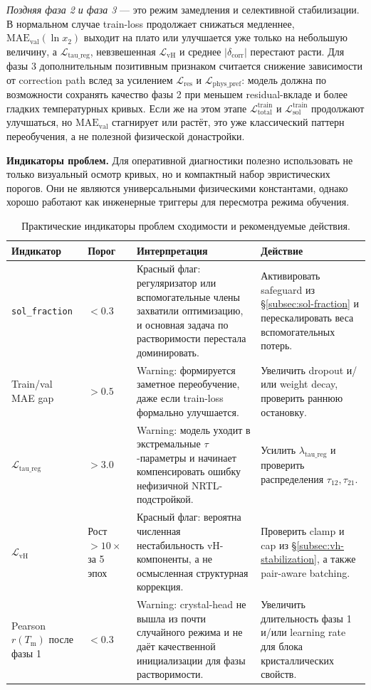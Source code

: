 \documentclass[11pt]{article}
\begin{document}
\textit{Поздняя фаза 2 и фаза 3} --- это режим замедления и селективной стабилизации. В нормальном случае train-loss продолжает снижаться медленнее, $\mathrm{MAE}_{\mathrm{val}}(\ln x_2)$ выходит на плато или улучшается уже только на небольшую величину, а $\mathcal{L}_{\mathrm{tau\_reg}}$, невзвешенная $\mathcal{L}_{\mathrm{vH}}$ и среднее $|\delta_{\mathrm{corr}}|$ перестают расти. Для фазы 3 дополнительным позитивным признаком считается снижение зависимости от correction path вслед за усилением $\mathcal{L}_{\mathrm{res}}$ и $\mathcal{L}_{\mathrm{phys\_pref}}$: модель должна по возможности сохранять качество фазы 2 при меньшем residual-вкладе и более гладких температурных кривых. Если же на этом этапе $\mathcal{L}_{\mathrm{total}}^{\mathrm{train}}$ и $\mathcal{L}_{\mathrm{sol}}^{\mathrm{train}}$ продолжают улучшаться, но $\mathrm{MAE}_{\mathrm{val}}$ стагнирует или растёт, это уже классический паттерн переобучения, а не полезной физической донастройки.

\textbf{Индикаторы проблем.} Для оперативной диагностики полезно использовать не только визуальный осмотр кривых, но и компактный набор эвристических порогов. Они не являются универсальными физическими константами, однако хорошо работают как инженерные триггеры для пересмотра режима обучения.

\begin{table}[H]
\centering
\small
\setlength{\tabcolsep}{4pt}
\begin{tabularx}{\textwidth}{|P{3.2cm}|P{2.0cm}|Y|Y|}
\hline
Индикатор & Порог & Интерпретация & Действие \\
\hline
\texttt{sol\_fraction} & $< 0.3$ & Красный флаг: регуляризатор или вспомогательные члены захватили оптимизацию, и основная задача по растворимости перестала доминировать. & Активировать safeguard из §\ref{subsec:sol-fraction} и перескалировать веса вспомогательных потерь. \\
\hline
Train/val MAE gap & $> 0.5$ & Warning: формируется заметное переобучение, даже если train-loss формально улучшается. & Увеличить dropout и/или weight decay, проверить раннюю остановку. \\
\hline
$\mathcal{L}_{\mathrm{tau\_reg}}$ & $> 3.0$ & Warning: модель уходит в экстремальные $\tau$-параметры и начинает компенсировать ошибку нефизичной NRTL-подстройкой. & Усилить $\lambda_{\mathrm{tau\_reg}}$ и проверить распределения $\tau_{12},\tau_{21}$. \\
\hline
$\mathcal{L}_{\mathrm{vH}}$ & Рост $>10\times$ за 5 эпох & Красный флаг: вероятна численная нестабильность vH-компоненты, а не осмысленная структурная коррекция. & Проверить clamp и cap из §\ref{subsec:vh-stabilization}, а также pair-aware batching. \\
\hline
Pearson $r(T_{\mathrm{m}})$ после фазы 1 & $< 0.3$ & Warning: crystal-head не вышла из почти случайного режима и не даёт качественной инициализации для фазы растворимости. & Увеличить длительность фазы 1 и/или learning rate для блока кристаллических свойств. \\
\hline
\end{tabularx}
\caption{Практические индикаторы проблем сходимости и рекомендуемые действия.}
\label{tab:convergence-indicators}
\end{table}
\end{document}
